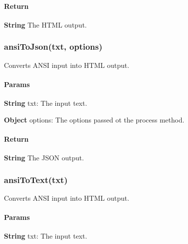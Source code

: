 \paragraph*{Return}


\begin{DoxyItemize}
\item {\bfseries String} The H\+T\+ML output.
\end{DoxyItemize}

\subsubsection*{{\ttfamily ansi\+To\+Json(txt, options)}}

Converts A\+N\+SI input into H\+T\+ML output.

\paragraph*{Params}


\begin{DoxyItemize}
\item {\bfseries String} {\ttfamily txt}\+: The input text.
\item {\bfseries Object} {\ttfamily options}\+: The options passed ot the {\ttfamily process} method.
\end{DoxyItemize}

\paragraph*{Return}


\begin{DoxyItemize}
\item {\bfseries String} The J\+S\+ON output.
\end{DoxyItemize}

\subsubsection*{{\ttfamily ansi\+To\+Text(txt)}}

Converts A\+N\+SI input into H\+T\+ML output.

\paragraph*{Params}


\begin{DoxyItemize}
\item {\bfseries String} {\ttfamily txt}\+: The input text.
\end{DoxyItemize}

